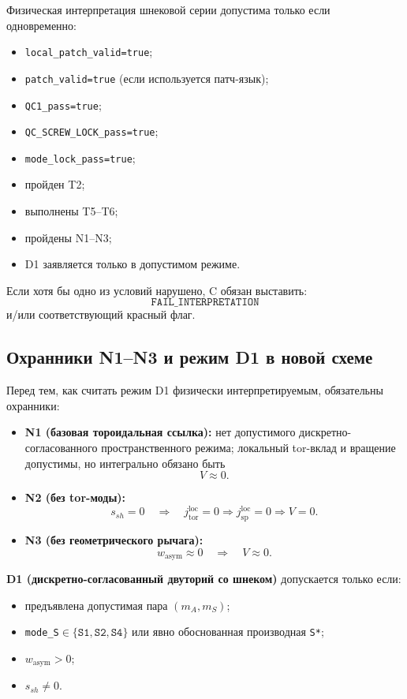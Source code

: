Физическая интерпретация шнековой серии допустима только если одновременно:
\begin{itemize}
\item \texttt{local\_patch\_valid=true};
\item \texttt{patch\_valid=true} (если используется патч-язык);
\item \texttt{QC1\_pass=true};
\item \texttt{QC\_SCREW\_LOCK\_pass=true};
\item \texttt{mode\_lock\_pass=true};
\item пройден T2;
\item выполнены T5--T6;
\item пройдены N1--N3;
\item D1 заявляется только в допустимом режиме.
\end{itemize}

Если хотя бы одно из условий нарушено, C обязан выставить:
\[
\texttt{FAIL\_INTERPRETATION}
\]
и/или соответствующий красный флаг.

\subsection{Охранники N1--N3 и режим D1 в новой схеме}

Перед тем, как считать режим D1 физически интерпретируемым, обязательны охранники:

\begin{itemize}
\item \textbf{N1 (базовая тороидальная ссылка):}
нет допустимого дискретно-согласованного пространственного режима; локальный tor-вклад и вращение допустимы,
но интегрально обязано быть
\[
V\approx 0.
\]

\item \textbf{N2 (без tor-моды):}
\[
s_{sh}=0 \quad \Longrightarrow \quad
j_{\mathrm{tor}}^{\mathrm{loc}}=0
\Longrightarrow
j_{\mathrm{sp}}^{\mathrm{loc}}=0
\Longrightarrow
V=0.
\]

\item \textbf{N3 (без геометрического рычага):}
\[
w_{\mathrm{asym}}\approx 0 \quad \Longrightarrow \quad V\approx 0.
\]
\end{itemize}

\textbf{D1 (дискретно-согласованный двуторий со шнеком)} допускается только если:
\begin{itemize}
\item предъявлена допустимая пара $(m_A,m_S)$;
\item \texttt{mode\_S}$\in\{\texttt{S1},\texttt{S2},\texttt{S4}\}$ или явно обоснованная производная \texttt{S*};
\item $w_{\mathrm{asym}}>0$;
\item $s_{sh}\neq 0$.
\end{itemize}

